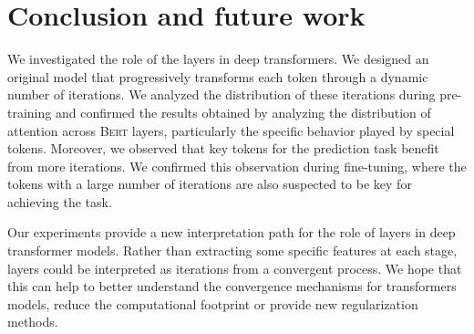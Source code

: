 \section{Conclusion and future work}

We investigated the role of the layers in deep transformers. We designed an original model that progressively transforms each token through a dynamic number of iterations. We analyzed the distribution of these iterations during pre-training and confirmed the results obtained by analyzing the distribution of attention across \textsc{Bert} layers, particularly the specific behavior played by special tokens. Moreover, we observed that key tokens for the prediction task benefit from more iterations. We confirmed this observation during fine-tuning, where the tokens with a large number of iterations are also suspected to be key for achieving the task.

Our experiments provide a new interpretation path for the role of layers in deep transformer models. Rather than extracting some specific features at each stage, layers could be interpreted as iterations from a convergent process. We hope that this can help to better understand the convergence mechanisms for transformers models, reduce the computational footprint or provide new regularization methods.

